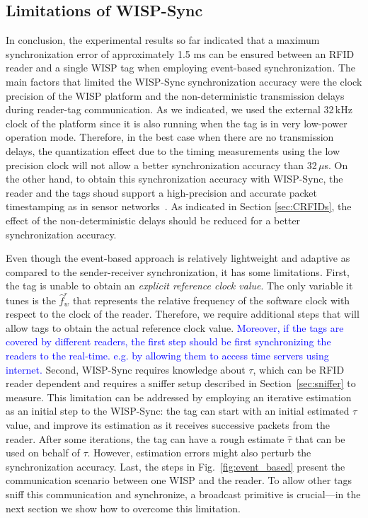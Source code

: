 \documentclass[10pt,journal,compsoc]{IEEEtran}
\newcommand{\add}[1]{\textcolor{blue}{#1}}
\begin{document}
\subsection{Limitations of WISP-Sync}

In conclusion, the experimental results so far indicated that a maximum synchronization error of approximately 1.5 ms can be ensured between an RFID reader and a single WISP tag when employing event-based synchronization. The main factors that limited the WISP-Sync synchronization accuracy were the clock precision of the WISP platform and the non-deterministic transmission delays during reader-tag communication. As we indicated, we used the external 32\,kHz clock of the platform since it is also running when the tag is in very low-power operation mode. Therefore, in the best case when there are no transmission delays, the quantization effect due to the timing measurements using the low precision clock will not allow a better synchronization accuracy than 32\,$\mu$s. On the other hand, to obtain this synchronization accuracy with WISP-Sync, the reader and the tags shoud support a high-precision and accurate packet timestamping as in sensor networks~\cite{Maroti2004}. As indicated in Section \ref{sec:CRFIDs}, the effect of the non-deterministic delays should be reduced for a better synchronization accuracy.

Even though the event-based approach is relatively lightweight and adaptive as compared to the sender-receiver synchronization, it has some limitations. First, the tag is unable to obtain an \emph{explicit reference clock value}. The only variable it tunes is the $\hat{f}_w^r$ that represents the relative frequency of the software clock with respect to the clock of the reader. Therefore, we require additional steps that will allow tags to obtain the actual reference clock value. \add{Moreover, if the tags are covered by different readers, the first step should be first synchronizing the readers to the real-time. e.g. by allowing them to access time servers using internet.}
Second, WISP-Sync requires knowledge about $\tau$, which can be RFID reader dependent and requires a sniffer setup described in Section~\ref{sec:sniffer} to measure. This limitation can be addressed by employing an iterative estimation as an initial step to the WISP-Sync: the tag can start with an initial estimated $\tau$ value, and improve its estimation as it receives successive packets from the reader. After some iterations, the tag can have a rough estimate $\hat{\tau}$ that can be used on behalf of $\tau$. However, estimation errors might also perturb the synchronization accuracy. Last, the steps in Fig.~\ref{fig:event_based} present the communication scenario between one WISP and the reader. To allow other tags sniff this communication and synchronize, a broadcast primitive is crucial---in the next section we show how to overcome this limitation.
\end{document}

